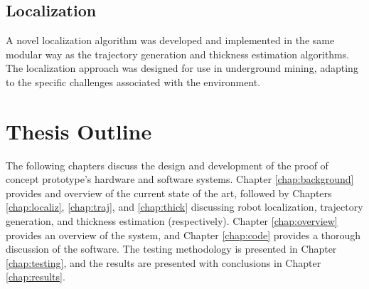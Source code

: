 \subsection{Localization}
A novel localization algorithm was developed and implemented in the same modular way as the trajectory generation and thickness estimation algorithms. The localization approach was designed for use in underground mining, adapting to the specific challenges associated with the environment.\\

\section{Thesis Outline}
\label{sec:outline}

The following chapters discuss the design and development of the proof of concept prototype's hardware and software systems. Chapter \ref{chap:background} provides and overview of the current state of the art, followed by Chapters \ref{chap:localiz}, \ref{chap:traj}, and \ref{chap:thick} discussing robot localization, trajectory generation, and thickness estimation (respectively). Chapter \ref{chap:overview} provides an overview of the system, and Chapter \ref{chap:code} provides a thorough discussion of the software. The testing methodology is presented in Chapter \ref{chap:testing}, and the results are presented with conclusions in Chapter \ref{chap:results}.\\